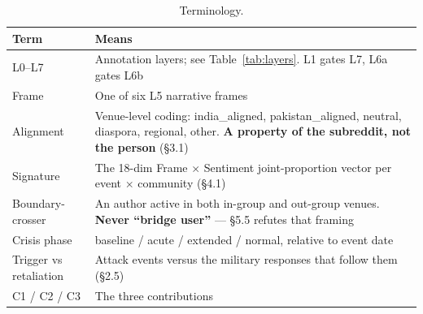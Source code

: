 \begin{table}[h]
  \caption{Terminology.}
  \label{tab:terminology}
  \small
  \begin{tabular}{@{}lp{10.4cm}@{}}
    \toprule
    Term & Means \\
    \midrule
    L0--L7 & Annotation layers; see Table~\ref{tab:layers}. L1 gates L7, L6a gates L6b \\
    Frame & One of six L5 narrative frames \\
    Alignment & Venue-level coding: india\_aligned, pakistan\_aligned, neutral, diaspora, regional, other. \textbf{A property of the subreddit, not the person} (\S3.1) \\
    Signature & The 18-dim Frame $\times$ Sentiment joint-proportion vector per event $\times$ community (\S4.1) \\
    Boundary-crosser & An author active in both in-group and out-group venues. \textbf{Never ``bridge user''} --- \S5.5 refutes that framing \\
    Crisis phase & baseline / acute / extended / normal, relative to event date \\
    Trigger vs retaliation & Attack events versus the military responses that follow them (\S2.5) \\
    C1 / C2 / C3 & The three contributions \\
    \bottomrule
  \end{tabular}
\end{table}

